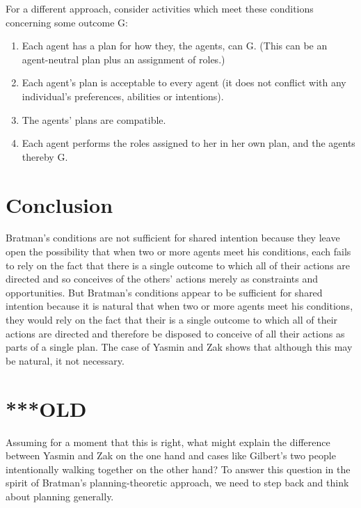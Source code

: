 \documentclass[12pt,\papersize]{extarticle}
\begin{document}
For a different approach, consider activities which meet these conditions concerning some outcome G:
\begin{enumerate}
\item Each agent has a plan for how they, the agents, can G.  (This can be an agent-neutral plan plus an assignment of roles.)
\item Each agent's plan is acceptable to every agent (it does not conflict with any individual's preferences, abilities or intentions).
\item The agents' plans are compatible.
\item Each agent performs the roles assigned to her in her own plan, and the agents thereby G. 
\end{enumerate}



%
%
%


\section{Conclusion}
Bratman's conditions are not sufficient for shared intention because they leave open the possibility that  when two or more agents meet his conditions, each fails to rely on the fact that there is a single outcome to which all of their actions are directed and so conceives of the others' actions merely as constraints and opportunities.
But Bratman's conditions appear to be sufficient for shared intention because it is natural that when two or more agents meet his conditions, they would rely on the fact that their is a single outcome to which all of their actions are directed and therefore be disposed to conceive of all their actions as parts of a single plan. 
The case of Yasmin and Zak shows that although this may be natural, it not necessary.



\section{***OLD}
Assuming for a moment that this is right,
what might explain the difference between Yasmin and Zak on the one hand and cases like Gilbert's two people intentionally walking together on the other hand?
To answer this question in the spirit of Bratman's planning-theoretic approach, we need to step back and think about planning generally.
\end{document}
